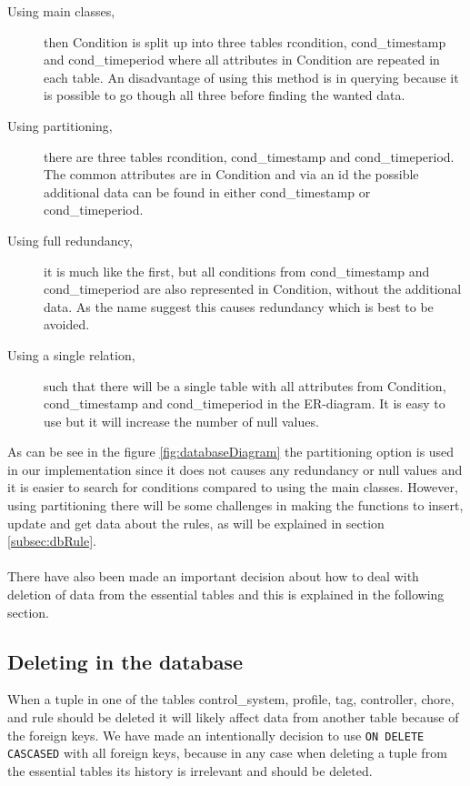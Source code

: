 \begin{description}
	\item[Using main classes,] then Condition is split up into three tables rcondition, cond\_timestamp and cond\_timeperiod where all attributes in Condition are repeated in each table. An disadvantage of using this method is in querying because it is possible to go though all three before finding the wanted data.
	\item[Using partitioning,] there are three tables rcondition, cond\_timestamp and cond\_timeperiod. The common attributes are in Condition and via an id the possible additional data can be found in either cond\_timestamp or cond\_timeperiod.
	\item[Using full redundancy,] it is much like the first, but all conditions from cond\_timestamp and cond\_timeperiod are also represented in Condition, without the additional data. As the name suggest this causes redundancy which is best to be avoided.
	\item[Using a single relation,] such that there will be a single table with all attributes from Condition, cond\_timestamp and cond\_timeperiod in the ER-diagram. It is easy to use but it will increase the number of null values. 
\end{description}

As can be see in the figure \ref{fig:databaseDiagram} the partitioning option is used in our implementation since it does not causes any redundancy or null values and it is easier to search for conditions compared to using the main classes. However, using partitioning there will be some challenges in making the functions to insert, update and get data about the rules, as will be explained in section \vref{subsec:dbRule}.\\\\

There have also been made an important decision about how to deal with deletion of data from the essential tables and this is explained in the following section.
 
\subsection{Deleting in the database}
When a tuple in one of the tables control\_system, profile, tag, controller, chore, and rule should be deleted it will likely affect data from another table because of the foreign keys. We have made an intentionally decision to use \texttt{ON DELETE CASCASED} with all foreign keys, because in any case when deleting a tuple from the essential tables its history is irrelevant and should be deleted.


